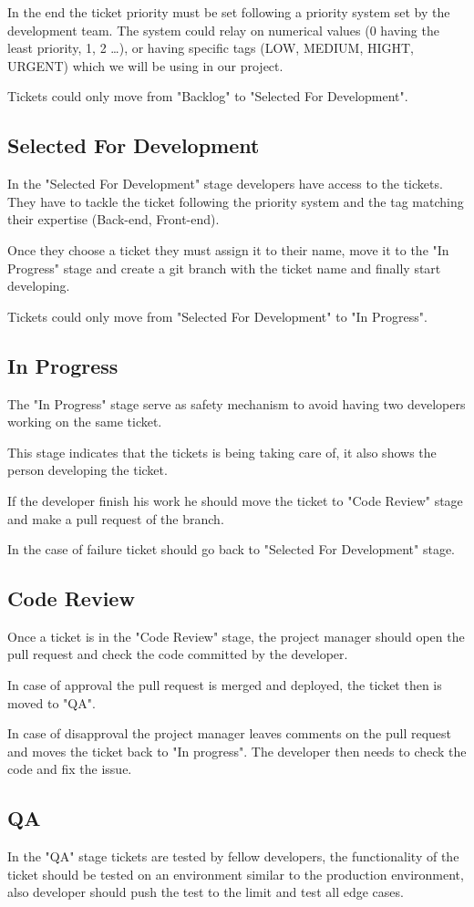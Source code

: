 \begin{spacing}{1.2}
In the end the ticket priority must be set following a priority system set by the development team. The system could relay on numerical values (0 having the least priority, 1, 2 \dots), or having specific tags (LOW, MEDIUM, HIGHT, URGENT) which we will be using in our project.

Tickets could only move from "Backlog" to "Selected For Development".
\subsection{Selected For Development}
In the "Selected For Development" stage developers have access to the tickets. They have to tackle the ticket following the priority system and the tag matching their expertise (Back-end, Front-end).

Once they choose a ticket they must assign it to their name, move it to the "In Progress" stage and create a git branch with the ticket name and finally start developing.

Tickets could only move from "Selected For Development" to "In Progress".
\subsection{In Progress}
The "In Progress" stage serve as safety mechanism to avoid having two developers working on the same ticket.

This stage indicates that the tickets is being taking care of, it also shows the person developing the ticket.

If the developer finish his work he should move the ticket to "Code Review" stage and make a pull request of the branch.


In the case of failure ticket should go back to "Selected For Development" stage. 
\subsection{Code Review}
Once a ticket is in the "Code Review" stage, the project manager should open the pull request and check the code committed by the developer.

In case of approval the pull request is merged and deployed, the ticket then is moved to "QA".


In case of disapproval the project manager leaves comments on the pull request and moves the ticket back to "In progress". The developer then needs to check the code and fix the issue.
\subsection{QA}
In the "QA" stage tickets are tested by fellow developers, the functionality of the ticket should be tested on an environment similar to the production environment, also developer should push the test to the limit and test all edge cases.


\end{spacing}
